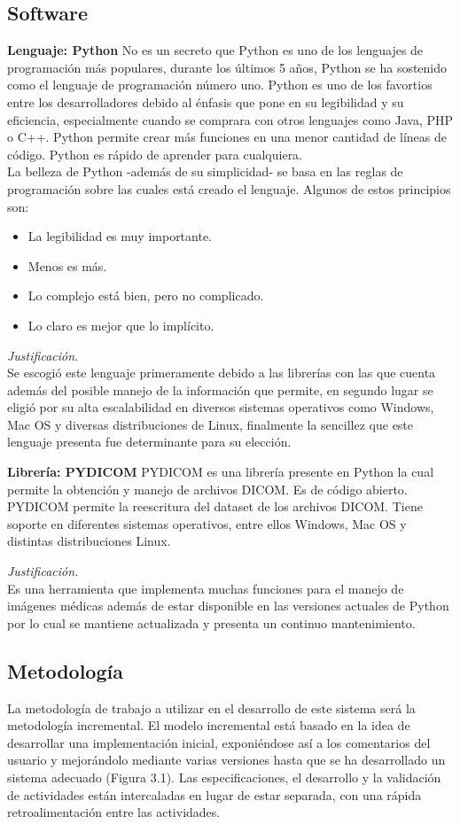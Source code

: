 \documentclass[12pt]{report}
\begin{document}
\subsection{Software}
\textbf{Lenguaje: Python}
No es un secreto que Python es uno de los lenguajes de programación más populares, durante los últimos 5 años, Python se ha sostenido como el lenguaje de programación número uno. Python es uno de los favortios entre los desarrolladores debido al énfasis que pone en su legibilidad y su eficiencia, especialmente cuando se comprara con otros lenguajes como Java, PHP o C++. Python permite crear más funciones en una menor cantidad de líneas de código. Python es rápido de aprender para cualquiera.\\
La belleza de Python -además de su simplicidad- se basa en las reglas de programación sobre las cuales está creado el lenguaje. Algunos de estos principios son:
\begin{itemize}
\item La legibilidad es muy importante.
\item Menos es más.
\item Lo complejo está bien, pero no complicado.
\item Lo claro es mejor que lo implícito.
\end{itemize}

\textit{Justificación.}\\ Se escogió este lenguaje primeramente debido a las librerías con las que cuenta además del posible manejo de la información que permite, en segundo lugar se eligió por su alta escalabilidad en diversos sistemas operativos como Windows, Mac OS y diversas distribuciones de Linux, finalmente la sencillez que este lenguaje presenta fue determinante para su elección.

\textbf{Librería: PYDICOM}
PYDICOM es una librería presente en Python la cual permite la obtención y manejo de archivos DICOM. Es de código abierto. PYDICOM permite la reescritura del dataset de los archivos DICOM. Tiene soporte en diferentes sistemas operativos, entre ellos Windows, Mac OS y distintas distribuciones Linux.

\textit{Justificación.}\\ Es una herramienta que implementa muchas funciones para el manejo de imágenes médicas además de estar disponible en las versiones actuales de Python por lo cual se mantiene actualizada y presenta un continuo mantenimiento.

\subsection{Metodología}
La metodología de trabajo a utilizar en el desarrollo de este sistema será la metodología incremental. El modelo incremental está basado en la idea de desarrollar una implementación inicial, exponiéndose así a los comentarios del usuario y mejorándolo mediante varias versiones hasta que se ha desarrollado un sistema adecuado (Figura 3.1). Las especificaciones, el desarrollo y la validación de actividades están intercaladas en lugar de estar separada, con una rápida retroalimentación entre las actividades.\cite{meto}
\end{document}
